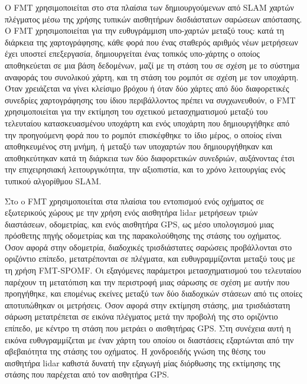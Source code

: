 Ο FMT χρησιμοποιείται στο \cite{Oberlander2013} στα πλαίσια των δημιουργούμενων
από SLAM χαρτών πλέγματος μέσω της χρήσης τυπικών αισθητήρων δισδιάστατων
σαρώσεων απόστασης. Ο FMT χρησιμοποιείται για την ευθυγράμμιση υπο-χαρτών
μεταξύ τους: κατά τη διάρκεια της χαρτογράφησης, κάθε φορά που ένας σταθερός
αριθμός νέων μετρήσεων έχει υποστεί επεξεργασία, δημιουργείται ένας τοπικός
υπο-χάρτης ο οποίος αποθηκεύεται σε μια βάση δεδομένων, μαζί με τη στάση του σε
σχέση με το σύστημα αναφοράς του συνολικού χάρτη, και τη στάση του ρομπότ σε
σχέση με τον υποχάρτη. Όταν χρειάζεται να γίνει κλείσιμο βρόχου ή όταν δύο
χάρτες από δύο διαφορετικές συνεδρίες χαρτογράφησης του ίδιου περιβάλλοντος
πρέπει να συγχωνευθούν, ο FMT χρησιμοποιείται για την εκτίμηση του σχετικού
μετασχηματισμού μεταξύ του τελευταίου κατασκευασμένου υποχάρτη και ενός
υποχάρτη που δημιουργήθηκε από την προηγούμενη φορά που το ρομπότ επισκέφθηκε
το ίδιο μέρος, ο οποίος είναι αποθηκευμένος στη μνήμη, ή μεταξύ των υποχαρτών
που δημιουργήθηκαν και αποθηκεύτηκαν κατά τη διάρκεια των δύο διαφορετικών
συνεδριών, αυξάνοντας έτσι την επιχειρησιακή λειτουργικότητα, την αξιοπιστία,
και το χρόνο λειτουργίας ενός τυπικού αλγορίθμου SLAM.

Στo \cite{Rohde2016} o FMT χρησιμοποιείται στα πλαίσια του εντοπισμού ενός
οχήματος σε εξωτερικούς χώρους με την χρήση ενός αισθητήρα lidar μετρήσεων
τριών διαστάσεων, οδομετρίας, και ενός αισθητήρα GPS, ως μέσο υπολογισμού μιας
πρόσθετης πηγής οδομετρίας και της παρακολούθησης της στάσης του οχήματος. Όσον
αφορά στην οδομετρία, διαδοχικές τρισδιάστατες σαρώσεις προβάλλονται στο
οριζόντιο επίπεδο, μετατρέπονται σε πλέγματα, και ευθυγραμμίζονται μεταξύ τους
με τη χρήση FMT-SPOMF. Οι εξαγόμενες παράμετροι μετασχηματισμού του τελευταίου
παρέχουν τη μετατόπιση και την περιστροφή μιας σάρωσης σε σχέση με αυτήν που
προηγήθηκε, και επομένως εκείνες μεταξύ των δύο διαδοχικών στάσεων από τις
οποίες αποτυπώθηκαν οι μετρήσεις. Όσον αφορά στην εκτίμηση στάσης, μια
τρισδιάστατη σάρωση μετατρέπεται σε εικόνα πλέγματος μετά την προβολή της στο
οριζόντιο επίπεδο, με κέντρο τη στάση που μετράει ο αισθητήρας GPS. Στη
συνέχεια αυτή η εικόνα ευθυγραμμίζεται με έναν χάρτη του οποίου οι διαστάσεις
εξαρτώνται από την αβεβαιότητα της στάσης του οχήματος. Η χονδροειδής γνώση της
θέσης του αισθητήρα lidar καθιστά δυνατή την εξαγωγή μίας διόρθωσης της
εκτίμησης της στάσης που παρέχεται από τον αισθητήρα GPS.
